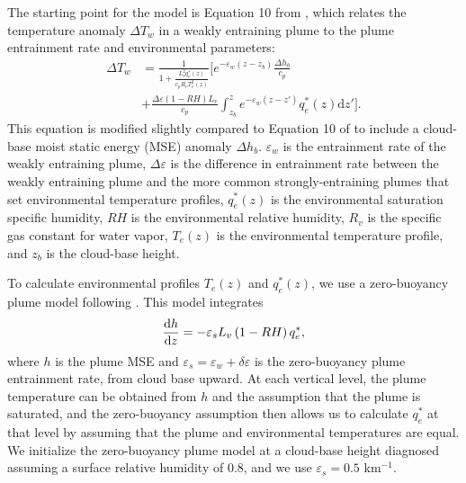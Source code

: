 \documentclass[twocol]{ametsoc}
\begin{document}
The starting point for the model is Equation 10 from \citet{Singh2015IncreasesEquilibrium}, which relates the temperature anomaly $\Delta T_w$ in a weakly entraining plume to the plume entrainment rate and environmental parameters:
\begin{equation}
\begin{split}
	\Delta T_w &= \frac{1}{1 + \frac{L_v^2 q^*_e(z)}{c_p R_v T_e^2(z)}} \bigg [ e^{-\varepsilon_w \left ( z - z_b \right )} \frac{\Delta h_b}{c_p} \\
	&+ \frac{\Delta \varepsilon \left(1 - RH \right) L_v}{c_p}\int_{z_b}^{z} e^{-\varepsilon_w (z - z')} q^*_e(z) \mathrm{d}z' \bigg ].
\end{split}
\end{equation}
This equation is modified slightly compared to Equation 10 of \citet{Singh2015IncreasesEquilibrium} to include a cloud-base moist static energy (MSE) anomaly $\Delta h_b$. $\varepsilon_w$ is the entrainment rate of the weakly entraining plume, $\Delta \varepsilon$ is the difference in entrainment rate between the weakly entraining plume and the more common strongly-entraining plumes that set environmental temperature profiles, $q^*_e(z)$ is the environmental saturation specific humidity, $RH$ is the environmental relative humidity, $R_v$ is the specific gas constant for water vapor, $T_e(z)$ is the environmental temperature profile, and $z_b$ is the cloud-base height. 

To calculate environmental profiles $T_e(z)$ and $q^*_e(z)$, we use a zero-buoyancy plume model following \citet{Singh2013InfluenceEquilibrium}. This model integrates
\begin{equation*}
    \frac{{\rm d}h}{{\rm d}z} = -\varepsilon_s L_v \left(1 - RH\right) q^*_e,
\end{equation*}
where $h$ is the plume MSE and $\varepsilon_s = \varepsilon_w + \delta \varepsilon$ is the zero-buoyancy plume entrainment rate, from cloud base upward. At each vertical level, the plume temperature can be obtained from $h$ and the assumption that the plume is saturated, and the zero-buoyancy assumption then allows us to calculate $q^*_e$ at that level by assuming that the plume and environmental temperatures are equal. We initialize the zero-buoyancy plume model at a cloud-base height diagnosed assuming a surface relative humidity of 0.8, and we use $\varepsilon_s = 0.5$ km$^{-1}$.
\end{document}
